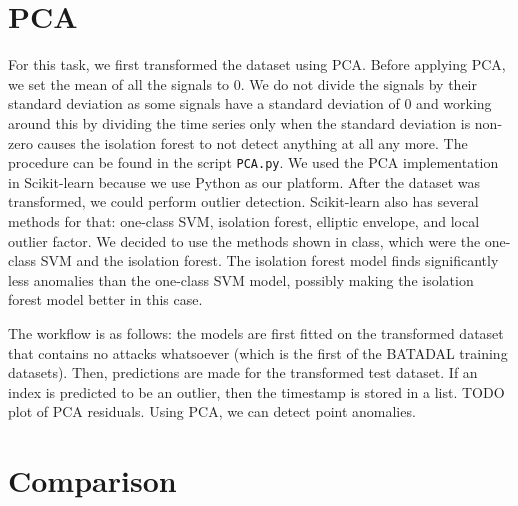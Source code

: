 \documentclass[]{article}
\begin{document}
\section{PCA}
For this task, we first transformed the dataset using PCA. Before applying PCA, we set the mean of all the signals to 0. We do not divide the signals by their standard deviation as some signals have a standard deviation of 0 and working around this by dividing the time series only when the standard deviation is non-zero causes the isolation forest to not detect anything at all any more. The procedure can be found in the script \texttt{PCA.py}. We used the PCA implementation in Scikit-learn because we use Python as our platform. After the dataset was transformed, we could perform outlier detection. Scikit-learn also has several methods for that: one-class SVM, isolation forest, elliptic envelope, and local outlier factor. We decided to use the methods shown in class, which were the one-class SVM and the isolation forest. The isolation forest model finds significantly less anomalies than the one-class SVM model, possibly making the isolation forest model better in this case.

The workflow is as follows: the models are first fitted on the transformed dataset that contains no attacks whatsoever (which is the first of the BATADAL training datasets). Then, predictions are made for the transformed test dataset. If an index is predicted to be an outlier, then the timestamp is stored in a list. TODO plot of PCA residuals. Using PCA, we can detect point anomalies.
\clearpage
\section{Comparison} 
\end{document}
